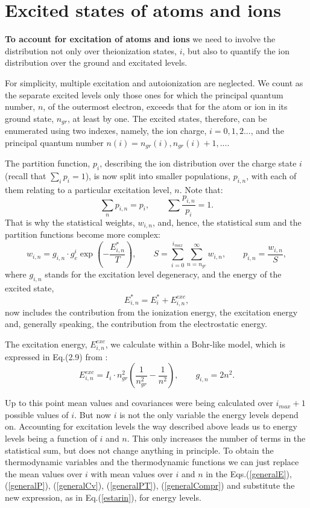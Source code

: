 \section{Excited states of atoms and ions}
{\bf To account for excitation of atoms and ions} we need to involve the
distribution not only over theionization states, $i$, but also to quantify the
ion distribution over the ground and 
excitated levels. 

For simplicity,  multiple excitation and autoionization are neglected. We
count as the separate excited levels only those ones for which the principal 
quantum number, 
$n$, of the outermost electron, exceeds that for the atom or ion in its ground state, 
$n_{gr}$, at least by one. The excited states, therefore, can be enumerated using two indexes,
namely, the ion charge, $i=0,1,2...$, and the principal quantum number 
$n(i)=n_{gr}(i),n_{gr}(i)+1,...$. 

The partition function, $p_i$, describing the ion distribution over the charge state $i$ 
(recall that $\sum_i{p_i}=1$), 
is now split into smaller populations, $p_{i,n}$, with each of them relating to a particular 
excitation level, $n$. Note that:
\begin{equation}
\sum_n{p_{i,n}}=p_i,\qquad \sum{\frac{p_{i,n}}{p_i}}=1.	
\end{equation}
That is why the statistical weights, $w_{i,n}$, and, hence, the statistical sum and the partition functions
become more complex:
\begin{equation}
w_{i,n} = g_{i,n} \cdot g_e^i \exp \left( -\frac{E^*_{i,n}}{T} \right),\qquad
S = \sum_{i=0}^{i_{max}} \sum_{n=n_{gr}}^{\infty} w_{i,n},\qquad
p_{i,n} = \frac{w_{i,n}}{S},
\end{equation}
where $g_{i,n}$ stands for the excitation level degeneracy, and the energy of the excited state,
\begin{equation}
E^*_{i,n}=E^*_i + E^{exc}_{i,n},
\end{equation} 
now includes the contribution from the ionization energy, the excitation energy and, generally 
speaking, the contribution from the electrostatic energy.

The excitation energy, $E^{exc}_{i,n}$, we calculate within a Bohr-like model, which is expressed in
Eq.(2.9) from \cite{ionmix}:
\begin{equation}\label{estarin}
E^{exc}_{i,n} = I_i \cdot n_{gr}^2 \left( \frac1{n_{gr}^2} - \frac1{n^2} \right), \qquad
g_{i,n} = 2 n^2.
\end{equation}

Up to this point mean values and covariances were being calculated over $i_{max}+1$ possible
values of $i$. But now $i$ is not the only variable the energy levels depend on.
Accounting for excitation levels the way described above leads us to energy levels
being a function of $i$ and $n$.
This only increases the number of terms in the statistical sum, but does not change
anything in principle. To obtain the thermodynamic variables and the thermodynamic functions
we can just replace the mean values over $i$ with mean values over $i$ and $n$ in the
Eqs.(\ref{generalE}), (\ref{generalP}), (\ref{generalCv}),
(\ref{generalPT}), (\ref{generalCompr}) and substitute the new expression, as in Eq.(\ref{estarin}), 
for energy levels.
